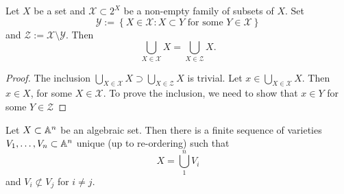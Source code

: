 \begin{lemma}\label{WeCanThrowAwaySmallSets}
    Let $X$ be a set and $\mathcal{X}\subset 2^X$ be a non-empty family of subsets of $X$. Set 
    $$\mathcal{Y} := \left\{ X\in \mathcal{X} : X \subset Y \text{ for some } Y\in \mathcal{X} \right\}$$
    and $\mathcal{Z} := \mathcal{X}\setminus \mathcal{Y}$. Then 
    $$\bigcup_{X \in \mathcal{X}} X = \bigcup_{X \in \mathcal{Z}} X.$$
\end{lemma}
\begin{proof}
    The inclusion $\bigcup_{X \in \mathcal{X}} X \supset \bigcup_{X \in \mathcal{Z}} X $ is trivial. Let $x\in \bigcup_{X \in \mathcal{X}} X$. Then $x\in X$, for some $X\in \mathcal{X}$. To prove the inclusion, we need to show that $x\in Y$ for some $Y\in \mathcal{Z}$
\end{proof}
\begin{theorem}
    Let $X\subset \mathbb{A}^n$ be an algebraic set. Then there is a finite sequence of varieties $V_1,\dots,V_n\subset \mathbb{A}^n$ unique (up to re-ordering) such that 
    $$X = \bigcup_1^n V_i$$
    and $V_i \not\subset V_j$ for $i\neq j$. 
\end{theorem}
